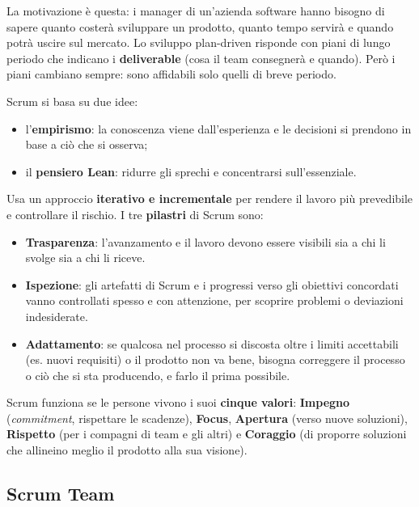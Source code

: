 La motivazione è questa: i manager di un'azienda software hanno bisogno
di sapere quanto costerà sviluppare un prodotto, quanto tempo servirà e
quando potrà uscire sul mercato. Lo sviluppo plan-driven risponde con
piani di lungo periodo che indicano i \textbf{deliverable} (cosa il team
consegnerà e quando). Però i piani cambiano sempre: sono affidabili solo
quelli di breve periodo.

Scrum si basa su due idee:

\begin{itemize}
\tightlist
\item
  l'\textbf{empirismo}: la conoscenza viene dall'esperienza e le
  decisioni si prendono in base a ciò che si osserva;
\item
  il \textbf{pensiero Lean}: ridurre gli sprechi e concentrarsi
  sull'essenziale.
\end{itemize}

Usa un approccio \textbf{iterativo e incrementale} per rendere il lavoro
più prevedibile e controllare il rischio. I tre \textbf{pilastri} di
Scrum sono:

\begin{itemize}
\tightlist
\item
  \textbf{Trasparenza}: l'avanzamento e il lavoro devono essere visibili
  sia a chi li svolge sia a chi li riceve.
\item
  \textbf{Ispezione}: gli artefatti di Scrum e i progressi verso gli
  obiettivi concordati vanno controllati spesso e con attenzione, per
  scoprire problemi o deviazioni indesiderate.
\item
  \textbf{Adattamento}: se qualcosa nel processo si discosta oltre i
  limiti accettabili (es. nuovi requisiti) o il prodotto non va bene,
  bisogna correggere il processo o ciò che si sta producendo, e farlo il
  prima possibile.
\end{itemize}

Scrum funziona se le persone vivono i suoi \textbf{cinque valori}:
\textbf{Impegno} (\emph{commitment}, rispettare le scadenze),
\textbf{Focus}, \textbf{Apertura} (verso nuove soluzioni),
\textbf{Rispetto} (per i compagni di team e gli altri) e
\textbf{Coraggio} (di proporre soluzioni che allineino meglio il
prodotto alla sua visione).

\subsection{Scrum Team}\label{scrum-team}

